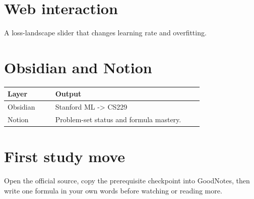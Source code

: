 \documentclass[11pt]{article}
\begin{document}
\section*{Web interaction}
A loss-landscape slider that changes learning rate and overfitting.

\section*{Obsidian and Notion}
\begin{tabular}{p{0.22\linewidth}p{0.68\linewidth}}
\toprule
Layer & Output \\
\midrule
Obsidian & Stanford ML -> CS229 \\
Notion & Problem-set status and formula mastery. \\
\bottomrule
\end{tabular}

\section*{First study move}
Open the official source, copy the prerequisite checkpoint into GoodNotes, then write one formula in your own words before watching or reading more.
\end{document}
